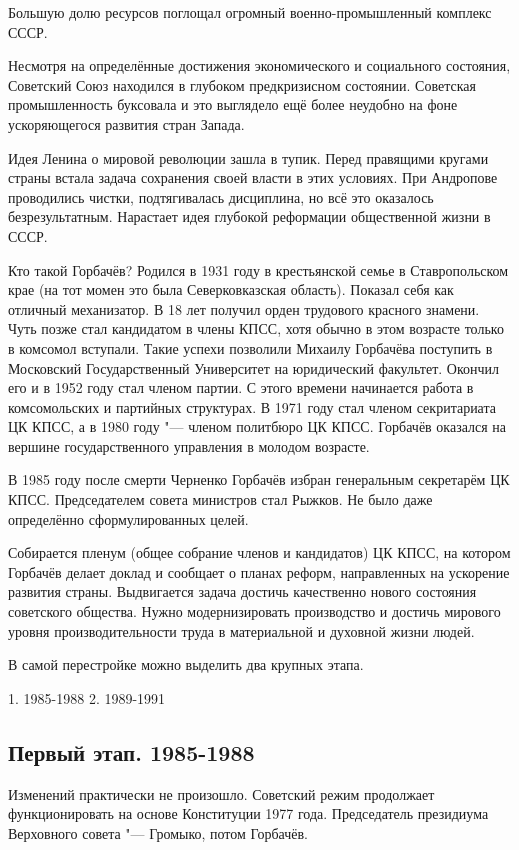 \documentclass{article}
\begin{document}
Большую долю ресурсов поглощал огромный военно-промышленный комплекс СССР.

Несмотря на определённые достижения экономического и социального состояния, Советский Союз находился в глубоком предкризисном состоянии. Советская промышленность буксовала и это выглядело ещё более неудобно на фоне ускоряющегося развития стран Запада.

Идея Ленина о мировой революции зашла в тупик. Перед правящими кругами страны встала задача сохранения своей власти в этих условиях. При Андропове проводились чистки, подтягивалась дисциплина, но всё это оказалось безрезультатным. Нарастает идея глубокой реформации общественной жизни в СССР.

Кто такой Горбачёв? Родился в 1931 году в крестьянской семье в Ставропольском крае (на тот момен это была Северковказская область). Показал себя как отличный механизатор. В 18 лет получил орден трудового красного знамени. Чуть позже стал кандидатом в члены КПСС, хотя обычно в этом возрасте только в комсомол вступали. Такие успехи позволили Михаилу Горбачёва поступить в Московский Государственный Университет на юридический факультет. Окончил его и в 1952 году стал членом партии. С этого времени начинается работа в комсомольских и партийных структурах. В 1971 году стал членом секритариата ЦК КПСС, а в 1980 году "--- членом политбюро ЦК КПСС. Горбачёв оказался на вершине государственного управления в молодом возрасте.

В 1985 году после смерти Черненко Горбачёв избран генеральным секретарём ЦК КПСС. Председателем совета министров стал Рыжков. Не было даже определённо сформулированных целей.

Собирается пленум (общее собрание членов и кандидатов) ЦК КПСС, на котором Горбачёв делает доклад и сообщает о планах реформ, направленных на ускорение развития страны. Выдвигается задача достичь качественно нового состояния советского общества. Нужно модернизировать производство и достичь мирового уровня производительности труда в материальной и духовной жизни людей.

В самой перестройке можно выделить два крупных этапа.

1. 1985-1988
2. 1989-1991

\subsection{Первый этап. 1985-1988}
Изменений практически не произошло. Советский режим продолжает функционировать на основе Конституции 1977 года. Председатель президиума Верховного совета "--- Громыко, потом Горбачёв.
\end{document}
